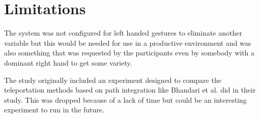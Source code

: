 \section{Limitations}
The system was not configured for left handed gestures to eliminate another variable but this would be needed for use in a productive environment and was also something that was requested by the participants even by somebody with a dominant right hand to get some variety. 

The study originally included an experiment designed to compare the teleportation methods based on path integration like Bhandari et al. \cite{Bhandari} did in their study. This was dropped because of a lack of time but could be an interesting experiment to run in the future.
